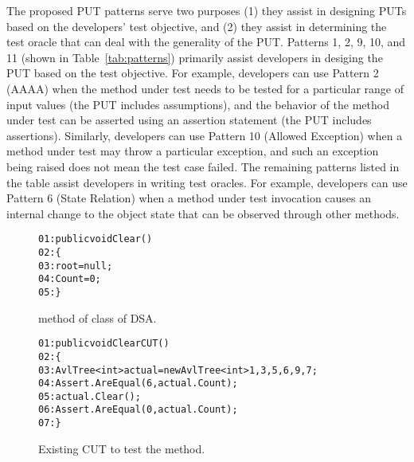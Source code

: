 The proposed PUT patterns serve two purposes (1) they assist in designing PUTs based on the developers' test objective, and (2) they assist in determining the test oracle that can deal with the generality of the PUT. Patterns 1, 2, 9, 10, and 11 (shown in Table~\ref{tab:patterns}) primarily assist developers in desiging the PUT based on the test objective. For example, developers can use Pattern 2 (AAAA) when the method under test needs to be tested for a particular range of input values (the PUT includes assumptions), and the behavior of the method under test can be asserted using an assertion statement (the PUT includes assertions). Similarly, developers can use Pattern 10 (Allowed Exception) when a method under test may throw a particular exception, and such an exception being raised does not mean the test case failed. 
The remaining patterns listed in the table assist developers in writing test oracles. For example, developers can use Pattern 6 (State Relation) when a method under test invocation causes an internal change to the object state that can be observed through other methods. 

\begin{figure}
\begin{CodeOut}        
\begin{alltt}
01: public void Clear()
02: \{
03: \hspace{0.07in}root = null;
04: \hspace{0.07in}Count = 0;
05: \}
\end{alltt}        
\end{CodeOut}\vspace*{-4ex}
\caption{ method of  class of DSA.}
\label{fig:pattern}%

\begin{CodeOut}        
\begin{alltt}
01: public void ClearCUT()
02: \{
03: \hspace{0.07in}AvlTree<int> actual = new AvlTree<int> { 1,3,5,6,9,7 };
04: \hspace{0.07in}Assert.AreEqual(6, actual.Count);
05: \hspace{0.07in}actual.Clear();
06: \hspace{0.07in}Assert.AreEqual(0, actual.Count);            
07: \}
\end{alltt}
\end{CodeOut}\vspace*{-4ex}
\caption{Existing CUT to test the  method.}%
\label{fig:patternCUT}%
\end{figure}

